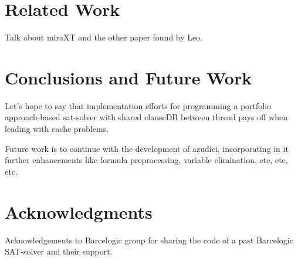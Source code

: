 \documentclass{llncs}
\begin{document}
\section{Related Work}

Talk about miraXT and the other paper found by Leo.

\section{Conclusions and Future Work}

Let's hope to say that implementation efforts for programming a
portfolio approach-based sat-solver with shared clauseDB between
thread pays off when leading with cache problems.

Future work is to continue with the development of  azudici,
incorporating in it further enhancements like formula preprocessing,
variable elimination, etc, etc, etc.

\section*{Acknowledgments}

Acknowledgements to Barcelogic group for sharing the code of a past
Barcelogic SAT-solver and their support.




\end{document}
